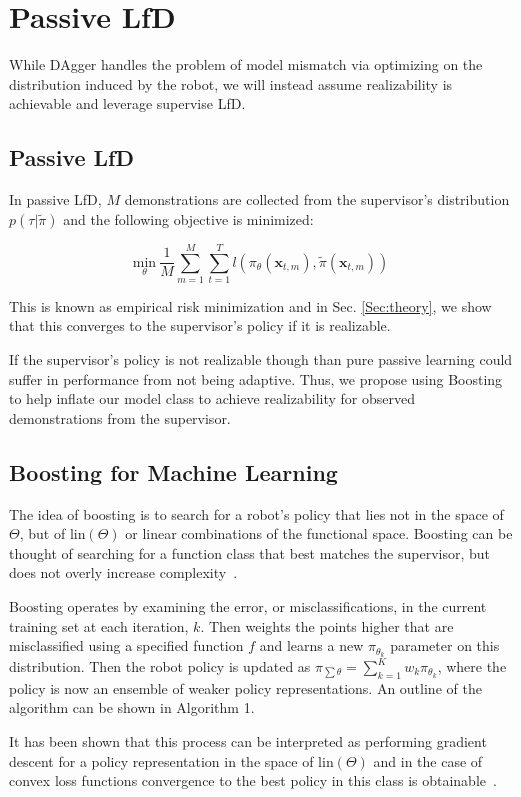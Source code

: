 \documentclass[10pt, conference]{ieeeconf}      %
\newcommand{\bx}{\mathbf{x}}
\begin{document}
\section{Passive LfD}
While DAgger handles the problem of model mismatch via optimizing on the distribution induced by the robot, we will instead assume realizability is achievable and leverage supervise LfD.  

\subsection{Passive LfD}
In passive LfD, $M$ demonstrations are collected from the supervisor's distribution $p(\tau|\tilde{\pi})$ and the following objective is minimized: 

$$\underset{\theta}{\mbox{min}} \: \frac{1}{M} \sum^M_{m=1} \sum^T_{t=1} l(\pi_{\theta}(\bx_{t,m}), \tilde{\pi}(\bx_{t,m}))$$

This is known as empirical risk minimization and in Sec. \ref{Sec:theory}, we show that this converges to the supervisor's policy if it is realizable. 

If the supervisor's policy is not realizable though than pure passive learning could suffer in performance from not being adaptive. Thus, we propose using Boosting to help inflate our model class to achieve realizability for observed demonstrations from the supervisor. 

\subsection{Boosting for Machine Learning}
The idea of boosting is to search for a robot's policy that lies not in the space of $\Theta$, but of $\mbox{lin}(\Theta)$ or linear combinations of the functional space. Boosting can be thought of searching for a function class that best matches the supervisor, but does not overly increase complexity~\cite{buhlmann2003boosting}.

Boosting operates by examining the error, or misclassifications, in the current training set at each iteration, $k$. Then weights the points higher that are misclassified using a specified function $f$ and learns a new $\pi_{\theta_k}$ parameter on this distribution.  Then the robot policy is updated as $\pi_{\sum \theta} = \sum^K_{k=1} w_k \pi_{\theta_k}$, where the policy is now an ensemble of weaker policy representations. An outline of the algorithm can be shown in Algorithm 1.

It has been shown that this process can be interpreted as performing gradient descent for a policy representation in the space of $\mbox{lin}(\Theta)$ and in the case of convex loss functions convergence to the best policy in this class is obtainable~\cite{mason1999boosting}.
\end{document}
